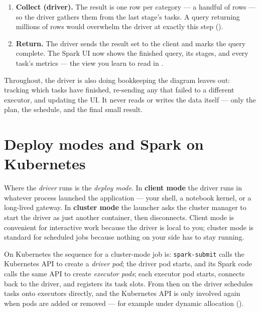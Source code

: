 \begin{enumerate}
        writes shuffle files again, this time keyed by \texttt{category}.
        Stage~3 fetches those, finishes the aggregate, and writes
        range-partitioned output for the \texttt{ORDER BY}; stage~4 sorts it.
  \item \textbf{Collect (driver).} The result is one row per category --- a
        handful of rows --- so the driver gathers them from the last stage's
        tasks. A query returning millions of rows would overwhelm the driver at
        exactly this step ().
  \item \textbf{Return.} The driver sends the result set to the client and marks
        the query complete. The Spark UI now shows the finished query, its
        stages, and every task's metrics --- the view you learn to read in
        .
\end{enumerate}

Throughout, the driver is also doing bookkeeping the diagram leaves out:
tracking which tasks have finished, re-sending any that failed to a different
executor, and updating the UI. It never reads or writes the data itself --- only
the plan, the schedule, and the final small result.

\section{Deploy modes and Spark on Kubernetes}
\label{sec:shape-deploy}

Where the \emph{driver} runs is the \emph{deploy mode}. In \textbf{client mode}
the driver runs in whatever process launched the application --- your shell, a
notebook kernel, or a long-lived gateway. In \textbf{cluster mode} the launcher
asks the cluster manager to start the driver as just another container, then
disconnects. Client mode is convenient for interactive work because the driver is
local to you; cluster mode is standard for scheduled jobs because nothing on your
side has to stay running.

On Kubernetes the sequence for a cluster-mode job is: \texttt{spark-submit} calls
the Kubernetes API to create a \emph{driver pod}; the driver pod starts, and its
Spark code calls the same API to create \emph{executor pods}; each executor pod
starts, connects back to the driver, and registers its task slots. From then on
the driver schedules tasks onto executors directly, and the Kubernetes API is
only involved again when pods are added or removed --- for example under dynamic
allocation ().

